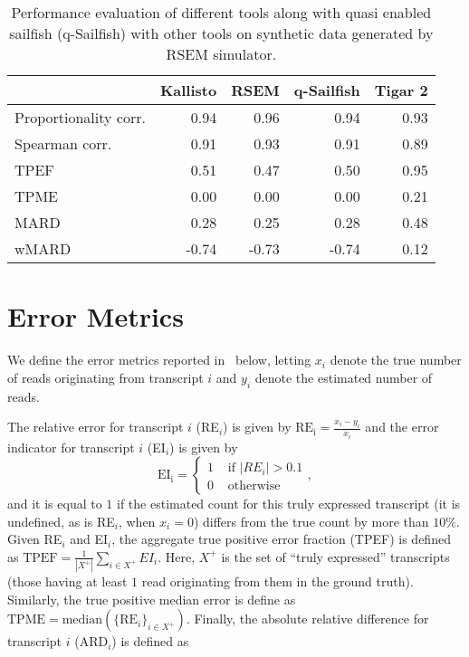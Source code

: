 \begin{table*}[hbtp]
\centering
\caption{Performance evaluation of different tools along with quasi enabled sailfish (q-Sailfish) with other tools on synthetic data generated by RSEM simulator.}
\label{tab:quant_perf_tpm_rsem}
\begin{tabulary}{2cm}{lrrrr}
\toprule	
{} &  Kallisto &  RSEM &  q-Sailfish &  Tigar 2 \\
\midrule
Proportionality corr. &0.94 &          0.96 &              0.94 &   0.93 \\
Spearman corr.        &0.91 &          0.93 &              0.91 &   0.89 \\
TPEF 		      &0.51 &          0.47 &              0.50 &   0.95 \\
TPME 		      &0.00 &          0.00 &              0.00 &   0.21 \\
MARD    	      &0.28 &          0.25 &              0.28 &   0.48 \\
wMARD 		      &-0.74 &         -0.73 &             -0.74 &   0.12 \\
\bottomrule
\end{tabulary}
\end{table*}

\section{Error Metrics}
\label{subsec:error_def}

We define the error metrics reported in~ below, letting $x_i$ denote the true number of reads originating from transcript $i$ and $y_i$ denote the estimated number of reads.

The relative error for transcript $i$ (RE$_i$) is given by $\mathrm{RE_i} = \frac{x_i - y_i}{x_i}$ and the error indicator for transcript $i$ (EI$_i$) is given by
%
\begin{equation}
  \mathrm{EI_i} =
  \begin{cases}
    1 & \text{ if } \left|RE_i\right| > 0.1 \\
    0 & \text{ otherwise }
  \end{cases},
  \label{eqn:tpeii}
\end{equation}
%
and it is equal to $1$ if the estimated count for this truly expressed transcript (it is undefined, as is RE$_i$, when $x_i = 0$) differs from the true count by more than $10\%$.  Given RE$_i$ and EI$_i$, the aggregate true positive error fraction (TPEF) is defined as $\text{TPEF} = \frac{1}{\left|X^{+}\right|}  \sum_{i \in X^{+}} EI_i$. Here, $X^{+}$ is the set of ``truly expressed'' transcripts (those having at least $1$ read originating from them in the ground truth).  Similarly, the true positive median error is define as $\text{TPME} = \text{median}\left(\{\text{RE}_i\}_{i \in X^{+}}\right)$.
Finally, the absolute relative difference for transcript $i$ (ARD$_i$) is defined as

